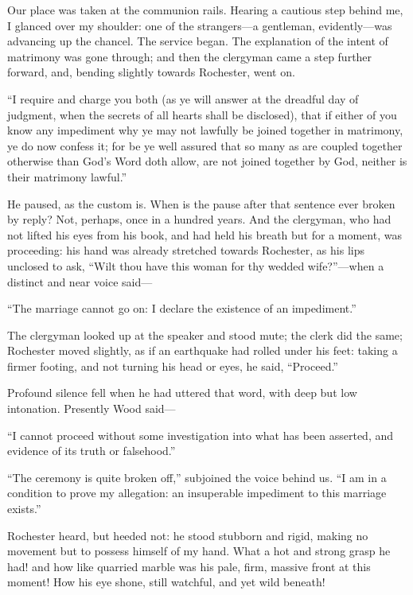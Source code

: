 Our place was taken at the communion rails. Hearing a cautious step
behind me, I glanced over my shoulder: one of the strangers---a
gentleman, evidently---was advancing up the chancel. The service
began. The explanation of the intent of matrimony was gone through; and
then the clergyman came a step further forward, and, bending slightly
towards \Mr{} Rochester, went on.

\enquote{I require and charge you both (as ye will answer at the
	dreadful day of judgment, when the secrets of all hearts shall be
	disclosed), that if either of you know any impediment why ye may not
	lawfully be joined together in matrimony, ye do now confess it; for be
	ye well assured that so many as are coupled together otherwise than
	God's Word doth allow, are not joined together by God, neither is their
	matrimony lawful.}

He paused, as the custom is. When is the pause after that sentence ever
broken by reply? Not, perhaps, once in a hundred years. And the
clergyman, who had not lifted his eyes from his book, and had held his
breath but for a moment, was proceeding: his hand was already stretched
towards \Mr{} Rochester, as his lips unclosed to ask, \enquote{Wilt thou
	have this woman for thy wedded wife?}---when a distinct and near voice
said---

\enquote{The marriage cannot go on: I declare the existence of an
	impediment.}

The clergyman looked up at the speaker and stood mute; the clerk did the
same; \Mr{} Rochester moved slightly, as if an earthquake had rolled under
his feet: taking a firmer footing, and not turning his head or eyes, he
said, \enquote{Proceed.}

Profound silence fell when he had uttered that word, with deep but low
intonation. Presently \Mr{} Wood said---

\enquote{I cannot proceed without some investigation into what has been
	asserted, and evidence of its truth or falsehood.}

\enquote{The ceremony is quite broken off,} subjoined the voice behind
us. \enquote{I am in a condition to prove my allegation: an insuperable
	impediment to this marriage exists.}

\Mr{} Rochester heard, but heeded not: he stood stubborn and rigid, making
no movement but to possess himself of my hand. What a hot and strong
grasp he had! and how like quarried marble was his pale, firm, massive
front at this moment! How his eye shone, still watchful, and yet wild
beneath!

